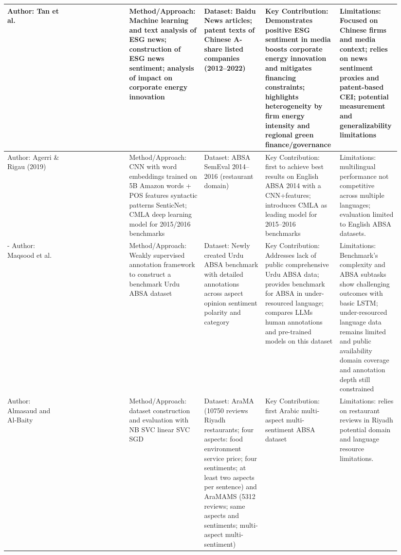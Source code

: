 \documentclass{article}
\begin{document}
\begin{landscape}
\begin{longtable}{p{0.157\linewidth} p{0.157\linewidth} p{0.157\linewidth} p{0.157\linewidth} p{0.157\linewidth} p{0.157\linewidth}}
Author: Tan et al. & ~ & Method/Approach: Machine learning and text analysis of ESG news; construction of ESG news sentiment; analysis of impact on corporate energy innovation & Dataset: Baidu News articles; patent texts of Chinese A-share listed companies (2012–2022) & Key Contribution: Demonstrates positive ESG sentiment in media boosts corporate energy innovation and mitigates financing constraints; highlights heterogeneity by firm energy intensity and regional green finance/governance & Limitations: Focused on Chinese firms and media context; relies on news sentiment proxies and patent-based CEI; potential measurement and generalizability limitations \\ \hline
Author: Agerri \& Rigau (2019) & ~ & Method/Approach: CNN with word embeddings trained on 5B Amazon words + POS features syntactic patterns SenticNet; CMLA deep learning model for 2015/2016 benchmarks & Dataset: ABSA SemEval 2014–2016 (restaurant domain) & Key Contribution: first to achieve best results on English ABSA 2014 with a CNN+features; introduces CMLA as leading model for 2015–2016 benchmarks & Limitations: multilingual performance not competitive across multiple languages; evaluation limited to English ABSA datasets. \\ \hline
- Author: Maqsood et al. & ~ & Method/Approach: Weakly supervised annotation framework to construct a benchmark Urdu ABSA dataset & Dataset: Newly created Urdu ABSA benchmark with detailed annotations across aspect opinion sentiment polarity and category & Key Contribution: Addresses lack of public comprehensive Urdu ABSA data; provides benchmark for ABSA in under-resourced language; compares LLMs human annotations and pre-trained models on this dataset & Limitations: Benchmark’s complexity and ABSA subtasks show challenging outcomes with basic LSTM; under-resourced language data remains limited and public availability domain coverage and annotation depth still constrained \\ \hline
Author: Almasaud and Al-Baity & ~ & Method/Approach: dataset construction and evaluation with NB SVC linear SVC SGD & Dataset: AraMA (10750 reviews Riyadh restaurants; four aspects: food environment service price; four sentiments; at least two aspects per sentence) and AraMAMS (5312 reviews; same aspects and sentiments; multi-aspect multi-sentiment) & Key Contribution: first Arabic multi-aspect multi-sentiment ABSA dataset & Limitations: relies on restaurant reviews in Riyadh potential domain and language resource limitations. \\ \hline

\end{longtable}
\end{landscape}
\end{document}
